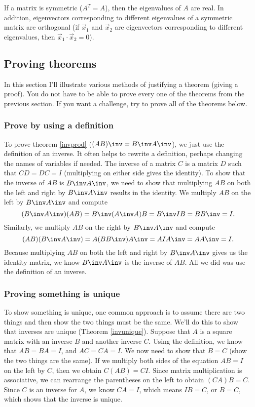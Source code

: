 \begin{theorem}\label{thm spectral}
If a matrix is symmetric ($A^T=A$), then the eigenvalues of $A$ are real. In addition, eigenvectors corresponding to different eigenvalues of a symmetric matrix are orthogonal (if $\vec x_1$ and $\vec x_2$ are eigenvectors corresponding to different eigenvalues, then $\vec x_1\cdot \vec x_2=0$).  
\end{theorem}











\subsection{Proving theorems}

In this section I'll illustrate various methods of justifying a theorem (giving a proof). You do not have to be able to prove every one of the theorems from the previous section. If you want a challenge, try to prove all of the theorems below.

\subsubsection{Prove by using a definition}
To prove theorem \ref{invprod} ($(AB)\inv=B\inv A \inv$), we just use the definition of an inverse. It often helps to rewrite a definition, perhaps changing the names of variables if needed. The inverse of a matrix $C$ is a matrix $D$ such that $CD=DC=I$ (multiplying on either side gives the identity). To show that the inverse of $AB$ is $B\inv A\inv$, we need to show that multiplying $AB$ on both the left and right by $B\inv A\inv$ results in the identity. We multiply $AB$ on the left by $B\inv A\inv$ and compute 
$$(B\inv A\inv)(AB) = B\inv (A\inv A)B = B\inv IB = BB\inv=I.$$
Similarly, we multiply $AB$ on the right by $B\inv A\inv$ and compute 
$$(AB)(B\inv A\inv) = A(BB\inv) A\inv = AIA\inv = AA\inv=I.$$
 Because multiplying $AB$ on both the left and right by $B\inv A\inv$ gives us the identity matrix, we know $B\inv A\inv$ is the inverse of $AB$. All we did was use the definition of an inverse.

\subsubsection{Proving something is unique}
To show something is unique, one common approach is to assume there are two things and then show the two things must be the same.  
We'll do this to show that inverses are unique (Theorem \ref{invunique}).  
Suppose that $A$ is a square matrix with an inverse $B$ and another inverse $C$.  
Using the definition, we know that $AB=BA=I$, and $AC=CA=I$.  
We now need to show that $B=C$ (show the two things are the same). 
If we multiply both sides of the equation $AB=I$ on the left by $C$, then we obtain $C(AB)=CI$. 
Since matrix multiplication is associative, we can rearrange the parentheses on the left to obtain $(CA)B=C$.  
Since $C$ is an inverse for $A$, we know $CA=I$, which means $IB=C$, or $B=C$, which shows that the inverse is unique.   



